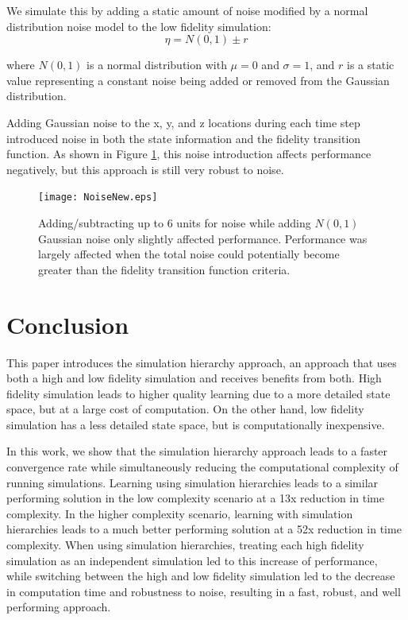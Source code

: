 \documentclass{sig-alternate}
\begin{document}
We simulate this by adding a static amount of noise modified by a normal distribution noise model to the low fidelity simulation:
%
\begin{equation}
\eta = N(0,1) \pm r
\end{equation} 

where $N(0,1)$ is a normal distribution with $\mu = 0$ and $\sigma = 1$, and $r$ is a static value representing a constant noise being added or removed from the Gaussian distribution.

Adding Gaussian noise to the x, y, and z locations during each time step introduced noise in both the state information and the fidelity transition function. As shown in Figure \ref{fig:NoiseAllRuns}, this noise introduction affects performance negatively, but this approach is still very robust to noise.

\begin{figure}
\centering
\texttt{[image: NoiseNew.eps]}
\caption{Adding/subtracting up to 6 units for noise while adding $N(0,1)$ Gaussian noise only slightly affected performance. Performance was largely affected when the total noise could potentially become greater than the fidelity transition function criteria. }
\label{fig:NoiseAllRuns}
\end{figure} 

\section{Conclusion}
This paper introduces the simulation hierarchy approach, an approach that uses both a high and low fidelity simulation and receives benefits from both. High fidelity simulation leads to higher quality learning due to a more detailed state space, but at a large cost of computation. On the other hand, low fidelity simulation has a less detailed state space, but is computationally inexpensive.

In this work, we show that the simulation hierarchy approach leads to a faster convergence rate while simultaneously reducing the computational complexity of running simulations. Learning using simulation hierarchies leads to a similar performing solution in the low complexity scenario at a 13x reduction in time complexity. In the higher complexity scenario, learning with simulation hierarchies leads to a much better performing solution at a 52x reduction in time complexity. When using simulation hierarchies, treating each high fidelity simulation as an independent simulation led to this increase of performance, while switching between the high and low fidelity simulation led to the decrease in computation time and robustness to noise, resulting in a fast, robust, and well performing approach.

\label{sec:CONCLUSION}




\end{document}
